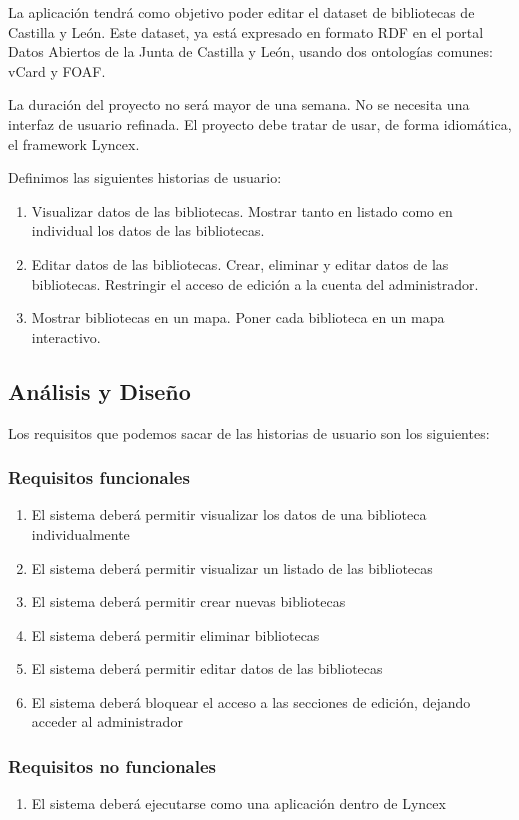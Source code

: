 \documentclass[12pt]{report} %
\begin{document}
La aplicación tendrá como objetivo poder editar el dataset de bibliotecas de Castilla y León. Este dataset, ya está expresado en formato RDF en el portal Datos Abiertos de la Junta de Castilla y León, usando dos ontologías comunes: vCard y FOAF.

La duración del proyecto no será mayor de una semana. No se necesita una interfaz de usuario refinada. El proyecto debe tratar de usar, de forma idiomática, el framework Lyncex.

Definimos las siguientes historias de usuario:
\begin{enumerate}
    \item Visualizar datos de las bibliotecas. Mostrar tanto en listado como en individual los datos de las bibliotecas.
    \item Editar datos de las bibliotecas. Crear, eliminar y editar datos de las bibliotecas. Restringir el acceso de edición a la cuenta del administrador.
    \item Mostrar bibliotecas en un mapa. Poner cada biblioteca en un mapa interactivo.
\end{enumerate}

\subsection{Análisis y Diseño}

Los requisitos que podemos sacar de las historias de usuario son los siguientes:

\subsubsection{Requisitos funcionales}
\begin{enumerate}
    \item El sistema deberá permitir visualizar los datos de una biblioteca individualmente
    \item El sistema deberá permitir visualizar un listado de las bibliotecas
    \item El sistema deberá permitir crear nuevas bibliotecas 
    \item El sistema deberá permitir eliminar bibliotecas
    \item El sistema deberá permitir editar datos de las bibliotecas
    \item El sistema deberá bloquear el acceso a las secciones de edición, dejando acceder al administrador
\end{enumerate}
\subsubsection{Requisitos no funcionales}
\begin{enumerate}
    \item El sistema deberá ejecutarse como una aplicación dentro de Lyncex
\end{enumerate}
\end{document}
